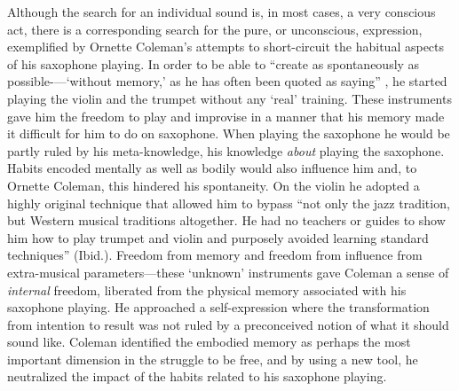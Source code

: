\documentclass[a4paper]{article}
\begin{document}
Although the search for an individual sound is, in most cases, a very conscious act, there is a corresponding search for the pure, or unconscious, expression, exemplified by Ornette Coleman’s attempts to short-circuit the habitual aspects of his saxophone playing. In order to be able to ``create as spontaneously as possible-—‘without memory,’ as he has often been quoted as saying'' \autocite[117]{litzweiler92}, he started playing the violin and the trumpet without any ‘real’ training. These instruments gave him the freedom to play and improvise in a manner that his memory made it difficult for him to do on saxophone. When playing the saxophone he would be partly ruled by his meta-knowledge, his knowledge \emph{about} playing the saxophone. Habits encoded mentally as well as bodily would also influence him and, to Ornette Coleman, this hindered his spontaneity. On the violin he adopted a highly original technique that allowed him to bypass ``not only the jazz tradition, but Western musical traditions altogether. He had no teachers or guides to show him how to play trumpet and violin and purposely avoided learning standard techniques'' (Ibid.). Freedom from memory and freedom from influence from extra-musical parameters—these ‘unknown’ instruments gave Coleman a sense of \emph{internal} freedom, liberated from the physical memory associated with his saxophone playing. He approached a self-expression where the transformation from intention to result was not ruled by a preconceived notion of what it should sound like. Coleman identified the embodied memory as perhaps the most important dimension in the struggle to be free, and by using a new tool, he neutralized the impact of the habits related to his saxophone playing.

\section*{ }
\label{sec:tu-dai-oan}

\end{document}
